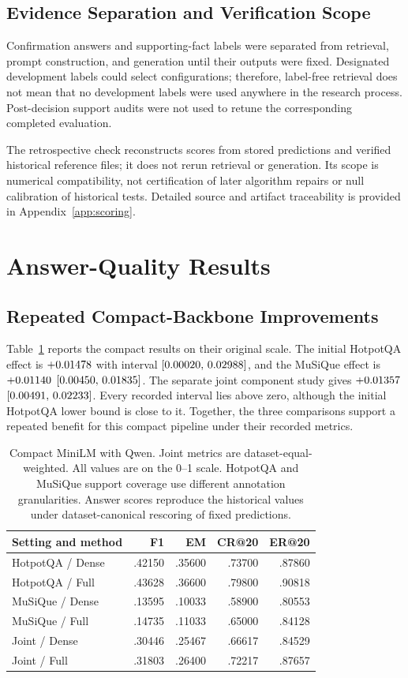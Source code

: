 \documentclass[11pt,a4paper]{article}
\begin{document}
\subsection{Evidence Separation and Verification Scope}
Confirmation answers and supporting-fact labels were separated from retrieval,
prompt construction, and generation until their outputs were fixed.
Designated development labels could select configurations; therefore,
label-free retrieval does not mean that no development labels were used
anywhere in the research process. Post-decision support audits were not used
to retune the corresponding completed evaluation.

The retrospective check reconstructs scores from stored predictions and
verified historical reference files; it does not rerun retrieval or generation.
Its scope is numerical compatibility, not certification of later algorithm
repairs or null calibration of historical tests. Detailed source and artifact
traceability is provided in Appendix~\ref{app:scoring}.

\section{Answer-Quality Results}
\subsection{Repeated Compact-Backbone Improvements}
Table~\ref{tab:compact} reports the compact results on their original scale.
The initial HotpotQA effect is $+0.01478$ with interval $[0.00020,\,0.02988]$,
and the MuSiQue effect is $+0.01140$ $[0.00450,\,0.01835]$.
The separate joint component study gives $+0.01357$ $[0.00491,\,0.02233]$.
Every recorded interval lies above zero, although the initial HotpotQA
lower bound is close to it. Together, the three comparisons support a
repeated benefit for this compact pipeline under their recorded metrics.

\begin{table}[t]
\centering\small
\begin{tabular}{@{}lrrrr@{}}
\toprule
Setting and method & F1 & EM & CR@20 & ER@20\\
\midrule
HotpotQA / Dense & .42150 & .35600 & .73700 & .87860\\
HotpotQA / Full & .43628 & .36600 & .79800 & .90818\\
MuSiQue / Dense & .13595 & .10033 & .58900 & .80553\\
MuSiQue / Full & .14735 & .11033 & .65000 & .84128\\
Joint / Dense & .30446 & .25467 & .66617 & .84529\\
Joint / Full & .31803 & .26400 & .72217 & .87657\\
\bottomrule
\end{tabular}
\caption{Compact MiniLM with Qwen. Joint metrics are dataset-equal-weighted.
All values are on the 0--1 scale. HotpotQA and MuSiQue support coverage use
different annotation granularities. Answer scores reproduce the historical
values under dataset-canonical rescoring of fixed predictions.}
\label{tab:compact}
\end{table}
\end{document}
